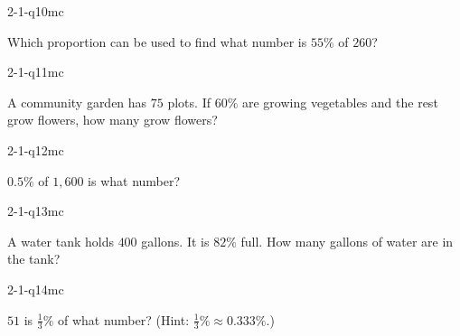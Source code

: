\begin{practiceQuestion}{2-1-q10}{mc}
\begin{questionText}
Which proportion can be used to find what number is $55\%$ of $260$?
\end{questionText}
\end{practiceQuestion}

\begin{practiceQuestion}{2-1-q11}{mc}
\begin{questionText}
A community garden has $75$ plots. If $60\%$ are growing vegetables and the rest grow flowers, how many grow flowers?
\end{questionText}
\end{practiceQuestion}

\begin{practiceQuestion}{2-1-q12}{mc}
\begin{questionText}
$0.5\%$ of $1{,}600$ is what number?
\end{questionText}
\end{practiceQuestion}

\begin{practiceQuestion}{2-1-q13}{mc}
\begin{questionText}
A water tank holds $400$ gallons. It is $82\%$ full. How many gallons of water are in the tank?
\end{questionText}
\end{practiceQuestion}

\begin{practiceQuestion}{2-1-q14}{mc}
\begin{questionText}
$51$ is $\frac{1}{3}\%$ of what number? (Hint: $\frac{1}{3}\% \approx 0.333\%$.)
\end{questionText}
\end{practiceQuestion}

